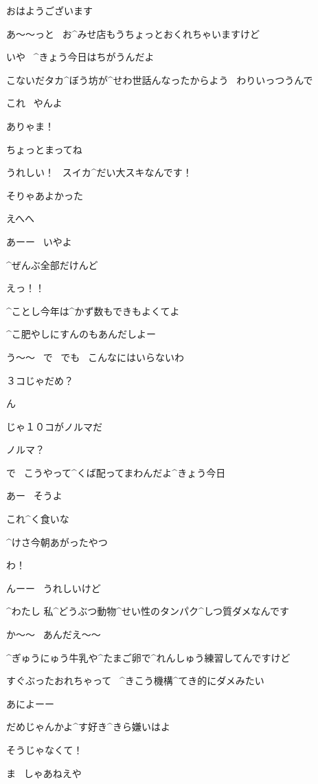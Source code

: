 \Alpha おはようございます

\page
\Alpha あ〜〜っと
\ お^{みせ}{店}もうちょっとおくれちゃいますけど

\Ojisan いや
\ ^{きょう}{今日}はちがうんだよ

\Ojisan こないだタカ^{ぼう}{坊}が^{せわ}{世話}んなったからよう
\ わりいっつうんで

\Ojisan これ
\ やんよ

\Alpha ありゃま！

\Alpha ちょっとまってね

\Alpha うれしい！
\ スイカ^{だい}{大}スキなんです！

\Ojisan そりゃあよかった

\page
\Alpha えへへ

\Ojisan あーー
\ いやよ

\Ojisan ^{ぜんぶ}{全部}だけんど

\Alpha えっ！！

\Ojisan ^{ことし}{今年}は^{かず}{数}もできもよくてよ

\Ojisan ^{こ}{肥}やしにすんのもあんだしよー

\Alpha う〜〜
\ で
\ でも
\ こんなにはいらないわ

\Alpha ３コじゃだめ？

\page
\Ojisan ん

\Ojisan じゃ１０コがノルマだ

\Alpha ノルマ？

\Ojisan で
\ こうやって^{くば}{配}ってまわんだよ^{きょう}{今日}

\Ojisan あー
\ そうよ

\page
\Ojisan これ^{く}{食}いな

\Ojisan ^{けさ}{今朝}あがったやつ

\Alpha わ！

\Alpha んーー
\ うれしいけど

\Alpha ^{わたし }{私}^{どうぶつ}{動物}^{せい}{性}のタンパク^{しつ}{質}ダメなんです

\Ojisan か〜〜
\ あんだえ〜〜

\Alpha ^{ぎゅうにゅう}{牛乳}や^{たまご}{卵}で^{れんしゅう}{練習}してんですけど

\Alpha すぐぶったおれちゃって
\ ^{きこう}{機構}^{てき}{的}にダメみたい

\page
\Ojisan あによーー

\Ojisan だめじゃんかよ^{す}{好}き^{きら}{嫌}いはよ

\Alpha そうじゃなくて！

\Ojisan ま
\ しゃあねえや

